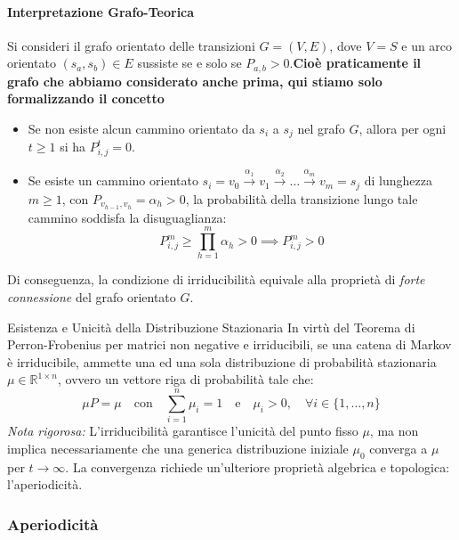 \paragraph{Interpretazione Grafo-Teorica}
Si consideri il grafo orientato delle transizioni $G = (V, E)$, dove $V = S$ e un arco orientato $(s_a, s_b) \in E$ sussiste se e solo se $P_{a,b} > 0$.\textbf{Cioè praticamente il grafo che abbiamo considerato anche prima, qui stiamo solo formalizzando il concetto}
\begin{itemize}
    \item Se non esiste alcun cammino orientato da $s_i$ a $s_j$ nel grafo $G$, allora per ogni $t \ge 1$ si ha $P_{i,j}^t = 0$.
    \item Se esiste un cammino orientato $s_i = v_0 \xrightarrow{\alpha_1} v_1 \xrightarrow{\alpha_2} \dots \xrightarrow{\alpha_m} v_m = s_j$ di lunghezza $m \ge 1$, con $P_{v_{h-1}, v_h} = \alpha_h > 0$, la probabilità della transizione lungo tale cammino soddisfa la disuguaglianza:
    \begin{equation*}
    P_{i,j}^m \ge \prod_{h=1}^m \alpha_h > 0 \implies P_{i,j}^m > 0
    \end{equation*}
\end{itemize}
Di conseguenza, la condizione di irriducibilità equivale alla proprietà di \emph{forte connessione} del grafo orientato $G$.

\begin{theorem}{Esistenza e Unicità della Distribuzione Stazionaria}
In virtù del Teorema di Perron-Frobenius per matrici non negative e irriducibili, se una catena di Markov è irriducibile, ammette una ed una sola distribuzione di probabilità stazionaria $\mu \in \mathbb{R}^{1 \times n}$, ovvero un vettore riga di probabilità tale che:
\begin{equation*}
\mu P = \mu \quad \text{con} \quad \sum_{i=1}^n \mu_i = 1 \quad \text{e} \quad \mu_i > 0, \quad \forall i \in \{1, \dots, n\}
\end{equation*}
\emph{Nota rigorosa:} L'irriducibilità garantisce l'unicità del punto fisso $\mu$, ma non implica necessariamente che una generica distribuzione iniziale $\mu_0$ converga a $\mu$ per $t \to \infty$. La convergenza richiede un'ulteriore proprietà algebrica e topologica: l'aperiodicità.
\end{theorem}

\subsubsection{Aperiodicità}

